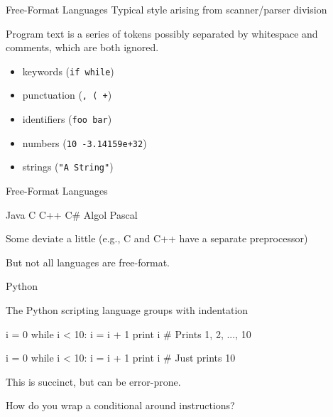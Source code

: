 \documentclass{plt}
\begin{document}
\begin{frame}{Free-Format Languages}
Typical style arising from scanner/parser division

Program text is a series of tokens possibly separated by whitespace
and comments, which are both ignored.

\begin{itemize}
\item keywords (\texttt{if while})
\item punctuation (\texttt{, ( +})
\item identifiers (\texttt{foo bar})
\item numbers (\texttt{10 -3.14159e+32})
\item strings (\texttt{"A String"})
\end{itemize}

\end{frame}

\begin{frame}{Free-Format Languages}

Java \hfil C \hfil C++ \hfil C\# \hfil Algol \hfil Pascal

Some deviate a little (e.g., C and C++ have a separate preprocessor)

But not all languages are free-format.
\end{frame}

%
%
%
%
%
%
%
%

\begin{frame}[fragile]{Python}

The Python scripting language groups with indentation

\begin{python}
i = 0
while i < 10:
    i = i + 1
    print i    # Prints 1, 2, ..., 10

i = 0
while i < 10:
    i = i + 1
print i        # Just prints 10
\end{python}

This is succinct, but can be error-prone.

How do you wrap a conditional around instructions?

\end{frame}
\end{document}
